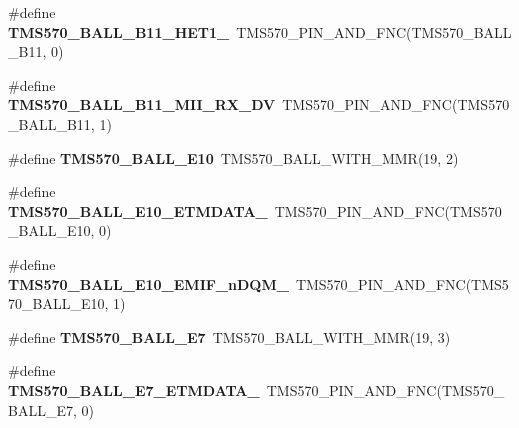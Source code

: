 \begin{DoxyCompactItemize}
\item 
\mbox{\label{tms570ls3137zwt-pins_8h_a4dce69323718b4c53b8ee4b7390d095c}} 
\#define {\bfseries T\+M\+S570\+\_\+\+B\+A\+L\+L\+\_\+\+B11\+\_\+\+H\+E\+T1\+\_}~T\+M\+S570\+\_\+\+P\+I\+N\+\_\+\+A\+N\+D\+\_\+\+F\+NC(T\+M\+S570\+\_\+\+B\+A\+L\+L\+\_\+\+B11, 0)
\item 
\mbox{\label{tms570ls3137zwt-pins_8h_a24a0212d2bd5a4ef63c22edea213db94}} 
\#define {\bfseries T\+M\+S570\+\_\+\+B\+A\+L\+L\+\_\+\+B11\+\_\+\+M\+I\+I\+\_\+\+R\+X\+\_\+\+DV}~T\+M\+S570\+\_\+\+P\+I\+N\+\_\+\+A\+N\+D\+\_\+\+F\+NC(T\+M\+S570\+\_\+\+B\+A\+L\+L\+\_\+\+B11, 1)
\item 
\mbox{\label{tms570ls3137zwt-pins_8h_a7ae459664cdae14b2914f6fca493ed9b}} 
\#define {\bfseries T\+M\+S570\+\_\+\+B\+A\+L\+L\+\_\+\+E10}~T\+M\+S570\+\_\+\+B\+A\+L\+L\+\_\+\+W\+I\+T\+H\+\_\+\+M\+MR(19, 2)
\item 
\mbox{\label{tms570ls3137zwt-pins_8h_a964ce035718b1ff5bcdf33217f6c0378}} 
\#define {\bfseries T\+M\+S570\+\_\+\+B\+A\+L\+L\+\_\+\+E10\+\_\+\+E\+T\+M\+D\+A\+T\+A\+\_}~T\+M\+S570\+\_\+\+P\+I\+N\+\_\+\+A\+N\+D\+\_\+\+F\+NC(T\+M\+S570\+\_\+\+B\+A\+L\+L\+\_\+\+E10, 0)
\item 
\mbox{\label{tms570ls3137zwt-pins_8h_a81c910bd54db345c1dd61c3953f3736e}} 
\#define {\bfseries T\+M\+S570\+\_\+\+B\+A\+L\+L\+\_\+\+E10\+\_\+\+E\+M\+I\+F\+\_\+n\+D\+Q\+M\+\_}~T\+M\+S570\+\_\+\+P\+I\+N\+\_\+\+A\+N\+D\+\_\+\+F\+NC(T\+M\+S570\+\_\+\+B\+A\+L\+L\+\_\+\+E10, 1)
\item 
\mbox{\label{tms570ls3137zwt-pins_8h_ab74766021e0ebf5856d54b7101ab3e7d}} 
\#define {\bfseries T\+M\+S570\+\_\+\+B\+A\+L\+L\+\_\+\+E7}~T\+M\+S570\+\_\+\+B\+A\+L\+L\+\_\+\+W\+I\+T\+H\+\_\+\+M\+MR(19, 3)
\item 
\mbox{\label{tms570ls3137zwt-pins_8h_a7b6f23ca2acdb459da0ee89d78a192d3}} 
\#define {\bfseries T\+M\+S570\+\_\+\+B\+A\+L\+L\+\_\+\+E7\+\_\+\+E\+T\+M\+D\+A\+T\+A\+\_}~T\+M\+S570\+\_\+\+P\+I\+N\+\_\+\+A\+N\+D\+\_\+\+F\+NC(T\+M\+S570\+\_\+\+B\+A\+L\+L\+\_\+\+E7, 0)
\item 

\end{DoxyCompactItemize}
